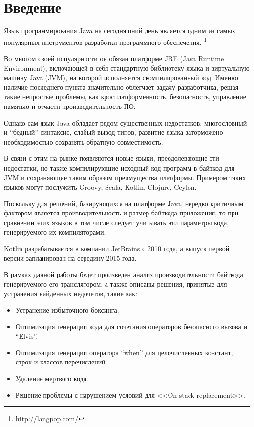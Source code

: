 \clearpage
\section*{Введение}

Язык программирования Java на сегодняшний день является одним из самых популярных инструментов
разработки программного обеспечения. \footnote{\url{http://langpop.com/}}

Во многом своей популярности он обязан платформе JRE (Java Runtime Environment), включающей в себя
стандартную библиотеку языка и виртуальную машину Java (JVM), на которой исполняется скомпилированный код.
Именно наличие последнего пункта значительно облегчает задачу разработчика, решая такие непростые
проблемы,  как кросплатформенность, безопасность, управление памятью и отчасти производительность ПО.

Однако сам язык Java обладает рядом существенных недостатков: многословный и ``бедный'' синтаксис,
слабый вывод типов, развитие языка заторможено необходимостью сохранять обратную совместимость.

В связи с этим на рынке появляются новые языки, преодолевающие эти недостатки, но также
компилирующие исходный код программ в байткод для JVM и сохраняющие таким образом преимущества платформы.
Примером таких языков могут послужить Groovy, Scala, Kotlin, Clojure, Ceylon.

Поскольку для решений, базирующихся на платформе Java, нередко критичным фактором является
производительность и размер байткода приложения, то при сравнении этих языков в том числе следует
учитывать эти параметры кода, генерируемого их компиляторами.

Kotlin разрабатывается в компании JetBrains с 2010 года, а выпуск первой версии запланирован на середину 2015 года.

В рамках данной работы будет произведен анализ производительности байткода генерируемого его транслятором,
а также описаны решения, принятые для устранения найденных недочетов, такие как:
\begin{itemize}
    \item Устранение избыточного боксинга.
    \item Оптимизация генерации кода для сочетания операторов безопасного вызова и ``Elvis''.
    \item Оптимизация генерации оператора ``when'' для целочисленных констант, строк и классов-перечислений.
    \item Удаление мертвого кода.
    \item Решение проблемы с нарушением условий для <<On-stack-replacement>>.
\end{itemize}

